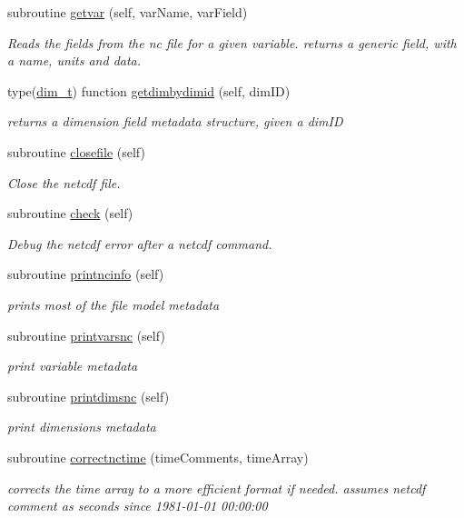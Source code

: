 \begin{DoxyCompactItemize}
subroutine \mbox{\hyperlink{namespacenetcdfparser__mod_a1f59a93ed593b1f4670d2c62fa9d5949}{getvar}} (self, var\+Name, var\+Field)
\begin{DoxyCompactList}\small\item\em Reads the fields from the nc file for a given variable. returns a generic field, with a name, units and data. \end{DoxyCompactList}\item 
type(\mbox{\hyperlink{structnetcdfparser__mod_1_1dim__t}{dim\+\_\+t}}) function \mbox{\hyperlink{namespacenetcdfparser__mod_a5fcd4b7fb27dbc9befd0a6fcfb9929a1}{getdimbydimid}} (self, dim\+ID)
\begin{DoxyCompactList}\small\item\em returns a dimension field metadata structure, given a dim\+ID \end{DoxyCompactList}\item 
subroutine \mbox{\hyperlink{namespacenetcdfparser__mod_a518627511cac4bf3dbc338bf3bfd5e24}{closefile}} (self)
\begin{DoxyCompactList}\small\item\em Close the netcdf file. \end{DoxyCompactList}\item 
subroutine \mbox{\hyperlink{namespacenetcdfparser__mod_ae1a034f6540ac7a1ce7d0e3831bb2f03}{check}} (self)
\begin{DoxyCompactList}\small\item\em Debug the netcdf error after a netcdf command. \end{DoxyCompactList}\item 
subroutine \mbox{\hyperlink{namespacenetcdfparser__mod_aeb48d33c014bae21b2fceaaa70cbdc67}{printncinfo}} (self)
\begin{DoxyCompactList}\small\item\em prints most of the file model metadata \end{DoxyCompactList}\item 
subroutine \mbox{\hyperlink{namespacenetcdfparser__mod_a6b57fa47d7bd796c75483216a51e5e04}{printvarsnc}} (self)
\begin{DoxyCompactList}\small\item\em print variable metadata \end{DoxyCompactList}\item 
subroutine \mbox{\hyperlink{namespacenetcdfparser__mod_ac01c000a97d23613684155708249ce89}{printdimsnc}} (self)
\begin{DoxyCompactList}\small\item\em print dimensions metadata \end{DoxyCompactList}\item 
subroutine \mbox{\hyperlink{namespacenetcdfparser__mod_af93319fde6cf6baedb7fe27bf3396e7b}{correctnctime}} (time\+Comments, time\+Array)
\begin{DoxyCompactList}\small\item\em corrects the time array to a more efficient format if needed. assumes netcdf comment as \textquotesingle{}seconds since 1981-\/01-\/01 00\+:00\+:00\textquotesingle{} \end{DoxyCompactList}\end{DoxyCompactItemize}


